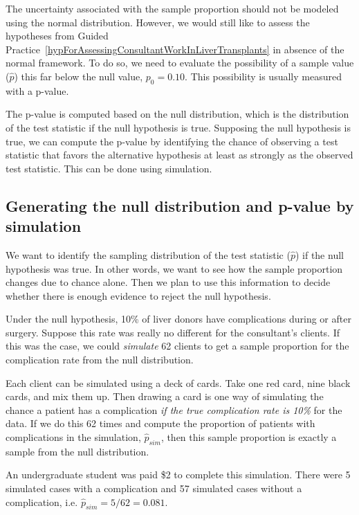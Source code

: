 The uncertainty associated with the sample proportion should not be modeled using the normal distribution. However, we would still like to assess the hypotheses from Guided Practice~\ref{hypForAssessingConsultantWorkInLiverTransplants} in absence of the normal framework. To do so, we need to evaluate the possibility of a sample value ($\hat{p}$) this far below the null value, $p_0=0.10$. This possibility is usually measured with a p-value.

The p-value is computed based on the null distribution, which is the distribution of the test statistic if the null hypothesis is true. Supposing the null hypothesis is true, we can compute the p-value by identifying the chance of observing a test statistic that favors the alternative hypothesis at least as strongly as the observed test statistic. This can be done using simulation.


\subsection{Generating the null distribution and p-value by simulation}
\label{generatingTheNullDistributionAndPValueBySimulationForOneProportion}

We want to identify the sampling distribution of the test statistic ($\hat{p}$) if the null hypothesis was true. In other words, we want to see how the sample proportion changes due to chance alone. Then we plan to use this information to decide whether there is enough evidence to reject the null hypothesis.

Under the null hypothesis, 10\% of liver donors have complications during or after surgery. Suppose this rate was really no different for the consultant's clients. If this was the case, we could \emph{simulate} 62 clients to get a sample proportion for the complication rate from the null distribution.

Each client can be simulated using a deck of cards. Take one red card, nine black cards, and mix them up. Then drawing a card is one way of simulating the chance a patient has a complication \emph{if the true complication rate is 10\%} for the data. If we do this 62 times and compute the proportion of patients with complications in the simulation, $\hat{p}_{sim}$, then this sample proportion is exactly a sample from the null distribution.

An undergraduate student was paid \$2 to complete this simulation. There were 5 simulated cases with a complication and 57 simulated cases without a complication, i.e. $\hat{p}_{sim} = 5/62 = 0.081$.

